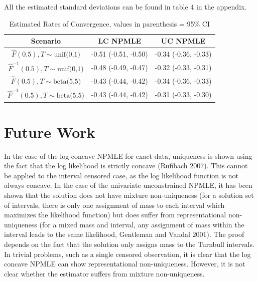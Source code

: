 \documentclass[10pt]{article}
\begin{document}
	All the estimated standard deviations can be found in table 4 in the appendix.
	
\begin{table}[H]
	
\label{EstConRates}
		
\begin{center}	
\caption[Test]{Estimated Rates of Convergence, values in parenthesis = 95\% CI}

\vspace{1mm} 
\begin{tabular} {| c | c | c |} 


	\hline	
		
	Scenario							& 	LC NPMLE 		& 	UC NPMLE  \\
	\hline	
	
$\hat F(0.5), T\sim \text{unif(0,1)}$		&	-0.51 (-0.51, -0.50)	&	-0.34 (-0.36, -0.33) \\


$\hat F^{-1}(0.5), T\sim \text{unif(0,1)}$	&	-0.48 (-0.49, -0.47)	&	-0.32 (-0.33, -0.31) \\
	
	\hline
	
$\hat F(0.5), T\sim \text{beta(5,5)}$		&	-0.43 (-0.44, -0.42)	&	-0.34 (-0.36, -0.33) \\


$\hat F^{-1}(0.5), T\sim \text{beta(5,5)}$	&	-0.43 (-0.44, -0.42)	&	-0.31 (-0.33, -0.30) \\
	
	\hline	
\end{tabular}
\end{center}

\end{table}
	
	
	
		

		
		
	{\section{Future Work} } 

	In the case of the log-concave NPMLE for exact data, uniqueness is shown using the fact that the log likelihood is strictly concave (Rufibach 2007). This cannot be applied to the interval censored case, as the log likelihood function is not always concave. In the case of the univariate unconstrained NPMLE, it has been shown that the solution does not have mixture non-uniqueness (for a solution set of intervals, there is only one assignment of mass to each interval which maximizes the likelihood function) but does suffer from representational non-uniqueness (for a mixed mass and interval, any assignment of mass within the interval leads to the same likelihood, Gentleman and Vandal 2001). The proof depends on the fact that the solution only assigns mass to the Turnbull intervals. In trivial problems, such as a single censored observation, it is clear that the log concave NPMLE can show representational non-uniqueness. However, it is not clear whether the estimator suffers from mixture non-uniqueness. 
	
\end{document}
